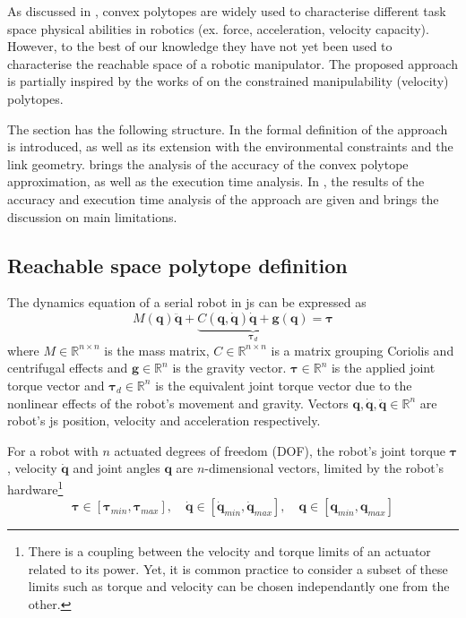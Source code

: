 As discussed in , convex polytopes are widely used to characterise different task space physical abilities in robotics (ex. force, acceleration, velocity capacity). However, to the best of our knowledge they have not yet been used to characterise the reachable space of a robotic manipulator. The proposed approach is partially inspired by the works of \citet{Long2018Evaluating} on the constrained manipulability (velocity) polytopes.  

The section has the following structure. In  the formal definition of the approach is introduced, as well as its extension with the environmental constraints and the link geometry.  brings the analysis of the accuracy of the convex polytope approximation, as well as the execution time analysis. In , the results of the accuracy and execution time analysis of the approach are given and  brings the discussion on main limitations.


\subsection{Reachable space polytope definition}
\label{ch:polytope}

The dynamics equation of a serial robot in \gls{js} can be expressed as
\begin{equation}
    M(\bm{q})\ddot{\bm{q}} +\underbrace{ C(\bm{q},\dot{\bm{q}})\dot{\bm{q}} + \bm{g}(\bm{q}) }_{\bm{\tau}_d}= \bm{\tau}
    \label{eq:robot_model}
\end{equation}
where $M\in\mathbb{R}^{n\times n}$ is the mass matrix, $C\in\mathbb{R}^{n\times n}$ is a matrix grouping Coriolis and centrifugal effects and $\bm{g}\in\mathbb{R}^{n}$ is the gravity vector. $\bm{\tau}\in\mathbb{R}^{n}$ is the applied joint torque vector and $\bm{\tau}_d\in\mathbb{R}^{n}$ is the equivalent joint torque vector due to the nonlinear effects of the robot's movement and gravity. Vectors $\bm{q},\dot{\bm{q}},\ddot{\bm{q}}\in\mathbb{R}^n$ are robot's \gls{js} position, velocity and acceleration respectively.

For a robot with $n$ actuated degrees of freedom (DOF), the robot's joint torque $\bm{\tau}$, velocity $\dot{\bm{q}}$ and joint angles $\bm{q}$ are $n$-dimensional vectors, limited by the robot's hardware\footnote{There is a coupling between the velocity and torque limits of an actuator related to its power. Yet, it is common practice to consider a subset of these limits such as torque and velocity can be chosen independantly one from the other.}
\begin{equation}
 \bm{\tau}\in\left[\bm{\tau}_{min},\bm{\tau}_{max}\right], \quad 
 \dot{\bm{q}}\in\left[\dot{\bm{q}}_{min},\dot{\bm{q}}_{max}\right], \quad \bm{q}\in\left[\bm{q}_{min},\bm{q}_{max}\right]
 \label{eq:limits}
\end{equation}


